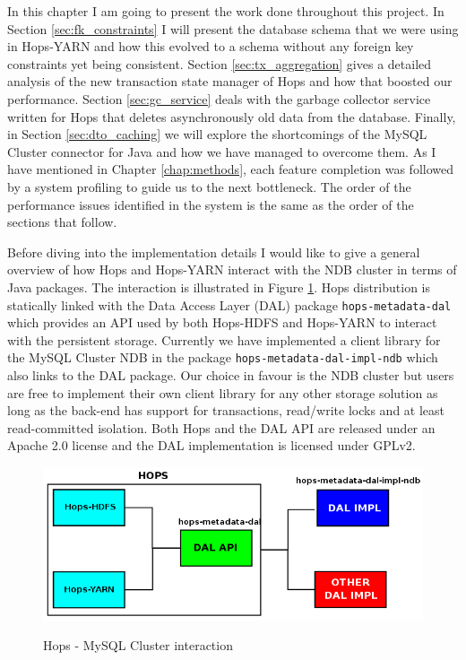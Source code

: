 In this chapter I am going to present the work done throughout this
project. In Section \ref{sec:fk_constraints} I will present the
database schema that we were using in Hops-YARN and how this evolved
to a schema without any foreign key constraints yet being
consistent. Section \ref{sec:tx_aggregation} gives a detailed analysis
of the new transaction state manager of Hops and how that boosted our
performance. Section \ref{sec:gc_service} deals with the garbage
collector service written for Hops that deletes asynchronously old
data from the database. Finally, in Section \ref{sec:dto_caching} we
will explore the shortcomings of the MySQL Cluster connector for Java and
how we have managed to overcome them. As I have mentioned in Chapter
\ref{chap:methods}, each feature completion was followed by a system
profiling to guide us to the next bottleneck. The order of the
performance issues identified in the system is the same as the order
of the sections that follow.

Before diving into the implementation details I would like to give a
general overview of how Hops and Hops-YARN interact with the NDB
cluster in terms of Java packages. The interaction is illustrated in
Figure \ref{fig:impl_hops_ndb}. Hops distribution is statically linked
with the Data Access Layer (DAL) package \texttt{hops-metadata-dal}
which provides an API used by both Hops-HDFS and Hops-YARN to interact
with the persistent storage. Currently we have implemented a client
library for the MySQL Cluster NDB in the package
\texttt{hops-metadata-dal-impl-ndb} which also links to the DAL
package. Our choice in favour is the NDB cluster but users are free to
implement their own client library for any other storage solution as
long as the back-end has support for transactions, read/write locks and
at least read-committed isolation. Both Hops and the DAL API are
released under an Apache 2.0 license and the DAL implementation is
licensed under GPLv2.

\begin{figure}
\centering
\includegraphics[scale=0.5]{resources/images/Implementation/hops_ndb_interaction.png}
\label{fig:impl_hops_ndb}
\caption{Hops - MySQL Cluster interaction}
\end{figure}
